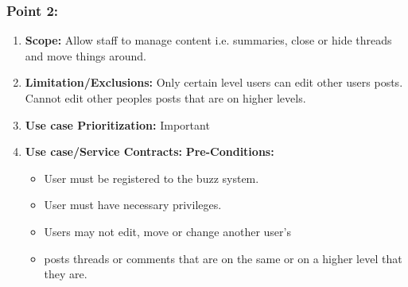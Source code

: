 \documentclass[11pt]{article}
\begin{document}
\subsubsection{Point 2:}
\begin{enumerate}
	\item 
	\textbf{Scope:}
	\newline
	Allow staff to manage content i.e. summaries, close or hide threads and move things around.
	\item\textbf{Limitation/Exclusions: }
	\newline
	 Only certain level users can edit other users posts.
	 Cannot edit other peoples posts that are on higher levels.
	\item\textbf{Use case Prioritization:} 
	\newline
	Important
		
	\item
	\textbf{Use case/Service Contracts:} 
	\newline\newline
	\textbf{Pre-Conditions: }
	\begin{itemize}
		\item User must be registered to the buzz system.
		\item User must have necessary privileges.
		\item Users may not edit, move or change another user’s \item posts threads or comments that are on the same or on a higher level that they are.
	\end{itemize}
	

\end{enumerate}
\end{document}
